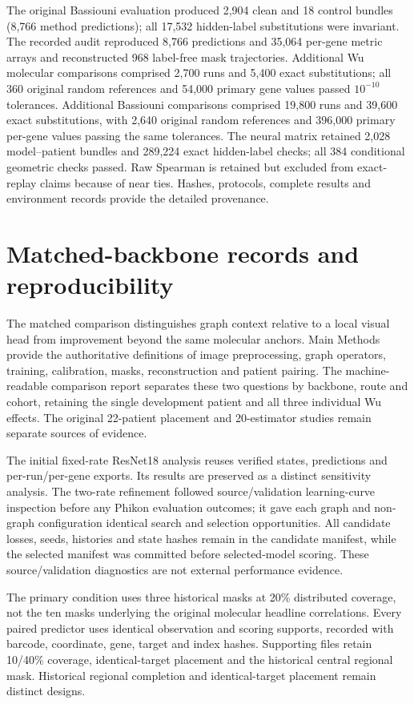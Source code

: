 The original Bassiouni evaluation produced 2,904 clean and 18 control bundles (8,766 method predictions); all 17,532 hidden-label substitutions were invariant. The recorded audit reproduced 8,766 predictions and 35,064 per-gene metric arrays and reconstructed 968 label-free mask trajectories. Additional Wu molecular comparisons comprised 2,700 runs and 5,400 exact substitutions; all 360 original random references and 54,000 primary gene values passed $10^{-10}$ tolerances. Additional Bassiouni comparisons comprised 19,800 runs and 39,600 exact substitutions, with 2,640 original random references and 396,000 primary per-gene values passing the same tolerances. The neural matrix retained 2,028 model--patient bundles and 289,224 exact hidden-label checks; all 384 conditional geometric checks passed. Raw Spearman is retained but excluded from exact-replay claims because of near ties. Hashes, protocols, complete results and environment records provide the detailed provenance.

\clearpage
\section{Matched-backbone records and reproducibility}
\label{sec:matched_records}
The matched comparison distinguishes graph context relative to a local visual head from improvement beyond the same molecular anchors. Main Methods provide the authoritative definitions of image preprocessing, graph operators, training, calibration, masks, reconstruction and patient pairing. The machine-readable comparison report separates these two questions by backbone, route and cohort, retaining the single development patient and all three individual Wu effects. The original 22-patient placement and 20-estimator studies remain separate sources of evidence.

The initial fixed-rate ResNet18 analysis reuses verified states, predictions and per-run/per-gene exports. Its results are preserved as a distinct sensitivity analysis. The two-rate refinement followed source/validation learning-curve inspection before any Phikon evaluation outcomes; it gave each graph and non-graph configuration identical search and selection opportunities. All candidate losses, seeds, histories and state hashes remain in the candidate manifest, while the selected manifest was committed before selected-model scoring. These source/validation diagnostics are not external performance evidence.

The primary condition uses three historical masks at 20\% distributed coverage, not the ten masks underlying the original molecular headline correlations. Every paired predictor uses identical observation and scoring supports, recorded with barcode, coordinate, gene, target and index hashes. Supporting files retain 10/40\% coverage, identical-target placement and the historical central regional mask. Historical regional completion and identical-target placement remain distinct designs.

